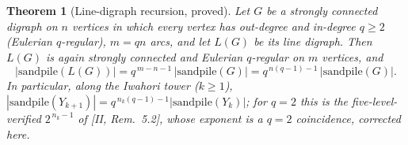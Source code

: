 \documentclass[11pt]{amsart}
\numberwithin{equation}{section}
\newtheorem{theorem}{Theorem}[section]
\theoremstyle{definition}
\theoremstyle{remark}
\begin{document}
\begin{theorem}[Line-digraph recursion, proved]\label{thm:recursion}
Let $G$ be a strongly connected digraph on $n$ vertices in which every vertex has
out-degree and in-degree $q\ge2$ (Eulerian $q$-regular), $m=qn$ arcs, and let $L(G)$
be its line digraph. Then $L(G)$ is again strongly connected and Eulerian
$q$-regular on $m$ vertices, and
\[
\bigl|\mathrm{sandpile}(L(G))\bigr|
=q^{\,m-n-1}\,\bigl|\mathrm{sandpile}(G)\bigr|
=q^{\,n(q-1)-1}\,\bigl|\mathrm{sandpile}(G)\bigr| .
\]
In particular, along the Iwahori tower ($k\ge1$),
$|\mathrm{sandpile}(Y_{k+1})|=q^{\,n_k(q-1)-1}|\mathrm{sandpile}(Y_k)|$; for $q=2$
this is the five-level-verified $2^{\,n_k-1}$ of [II, Rem.~5.2], whose exponent is a
$q=2$ coincidence, corrected here.
\end{theorem}
\end{document}
